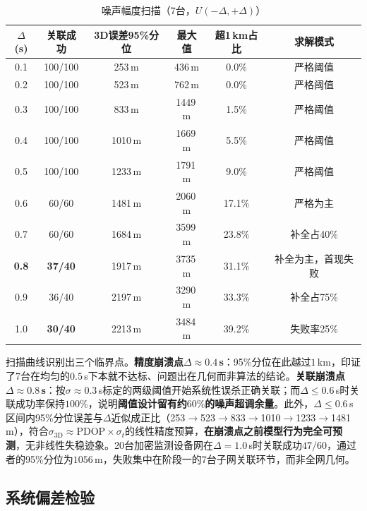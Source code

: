 \documentclass[draft,12pt,a4paper]{ctexart}
\theoremstyle{definition}
\begin{document}
\begin{table}[H]\centering
  \caption{噪声幅度扫描（7台，$U(-\Delta,+\Delta)$）}\label{tab:test-delta}
  \small
  \begin{tabular}{cccccc}
    \toprule
    $\Delta$\textbf{(s)} & \textbf{关联成功} & \textbf{3D误差95\%分位} & \textbf{最大值} & \textbf{超1\,km占比} & \textbf{求解模式} \\
    \midrule
    0.1 & 100/100 & 253\,m & 436\,m & 0.0\% & 严格阈值 \\
    0.2 & 100/100 & 523\,m & 762\,m & 0.0\% & 严格阈值 \\
    0.3 & 100/100 & 833\,m & 1449\,m & 1.5\% & 严格阈值 \\
    0.4 & 100/100 & 1010\,m & 1669\,m & 5.5\% & 严格阈值 \\
    0.5 & 100/100 & 1233\,m & 1791\,m & 9.0\% & 严格阈值 \\
    0.6 & 60/60 & 1481\,m & 2060\,m & 17.1\% & 严格为主 \\
    0.7 & 60/60 & 1684\,m & 3599\,m & 23.8\% & 补全占40\% \\
    \textbf{0.8} & \textbf{37/40} & 1917\,m & 3735\,m & 31.1\% & 补全为主，首现失败 \\
    0.9 & 36/40 & 2197\,m & 3290\,m & 33.3\% & 补全占75\% \\
    1.0 & \textbf{30/40} & 2213\,m & 3484\,m & 39.2\% & 失败率25\% \\
    \bottomrule
  \end{tabular}
\end{table}

扫描曲线识别出三个临界点。\textbf{精度崩溃点$\Delta\approx0.4$\,s}：95\%分位在此越过$1$\,km，印证了7台在均匀的$0.5$\,s下本就不达标、问题出在几何而非算法的结论。\textbf{关联崩溃点$\Delta\approx0.8$\,s}：按$\sigma\approx0.3$\,s标定的两级阈值开始系统性误杀正确关联；而$\Delta\leq0.6$\,s时关联成功率保持$100\%$，说明\textbf{阈值设计留有约$60\%$的噪声超调余量}。此外，$\Delta\leq0.6$\,s区间内95\%分位误差与$\Delta$近似成正比（253$\to$523$\to$833$\to$1010$\to$1233$\to$1481\,m），符合$\sigma_{\mathrm{3D}}\approx\mathrm{PDOP}\times\sigma_t$的线性精度预算，\textbf{在崩溃点之前模型行为完全可预测}，无非线性失稳迹象。20台加密监测设备网在$\Delta=1.0$\,s时关联成功$47/60$，通过者的95\%分位为$1056$\,m，失败集中在阶段一的7台子网关联环节，而非全网几何。

\subsection{系统偏差检验}
\end{document}
